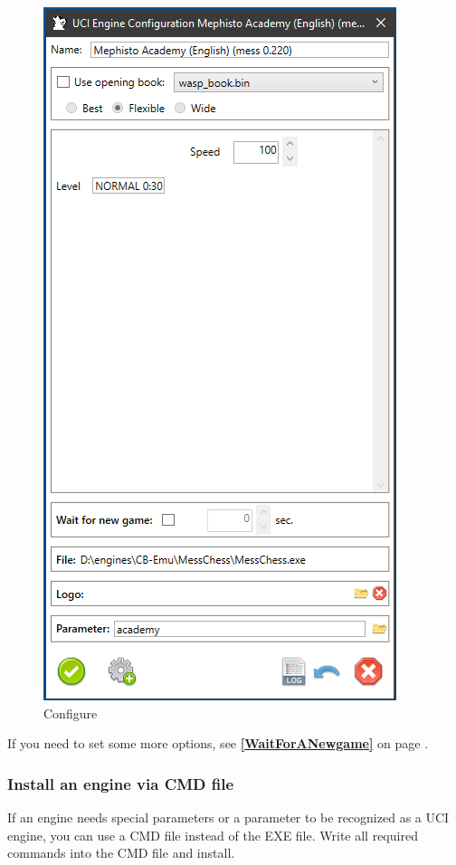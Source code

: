 \documentclass[11pt,a4paper]{article}
\begin{document}
\begin{figure}[H]
	\centering
	\includegraphics[scale=0.8]{MessChess3.png}
	\caption{Configure}
	\label{fig:MessChess3}
\end{figure}

If you need to set some more options, see \textbf{\ref{WaitForANewgame}  } on page \pageref{WaitForANewgame}.

\subsubsection{Install an engine via CMD file} \label{ViaCMDFile}
If an engine needs special parameters or a parameter to be recognized as a UCI engine, you can use a CMD file instead of the EXE file. Write all required commands into the CMD file and install.
\end{document}
